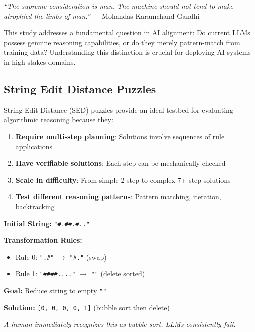 \documentclass[11pt,a4paper]{article}
\begin{document}
\begin{tcolorbox}[colback=blue!5,colframe=blue!50!black,title=AI Alignment Context]
\textit{``The supreme consideration is man. The machine should not tend to make atrophied the limbs of man.''} --- Mohandas Karamchand Gandhi

This study addresses a fundamental question in AI alignment: Do current LLMs possess genuine reasoning capabilities, or do they merely pattern-match from training data? Understanding this distinction is crucial for deploying AI systems in high-stakes domains.
\end{tcolorbox}

\subsection{String Edit Distance Puzzles}

String Edit Distance (SED) puzzles provide an ideal testbed for evaluating algorithmic reasoning because they:

\begin{enumerate}[leftmargin=*]
    \item \textbf{Require multi-step planning}: Solutions involve sequences of rule applications
    \item \textbf{Have verifiable solutions}: Each step can be mechanically checked
    \item \textbf{Scale in difficulty}: From simple 2-step to complex 7+ step solutions
    \item \textbf{Test different reasoning patterns}: Pattern matching, iteration, backtracking
\end{enumerate}

\begin{tcolorbox}[colback=gray!5,colframe=gray!50!black,title=Example SED Puzzle]
\textbf{Initial String:} \texttt{"\#.\#\#.\#.."}

\textbf{Transformation Rules:}
\begin{itemize}
    \item Rule 0: \texttt{".\#"} $\rightarrow$ \texttt{"\#."} (swap)
    \item Rule 1: \texttt{"\#\#\#\#...."} $\rightarrow$ \texttt{""} (delete sorted)
\end{itemize}

\textbf{Goal:} Reduce string to empty \texttt{""}

\textbf{Solution:} \texttt{[0, 0, 0, 0, 1]} (bubble sort then delete)

\textit{A human immediately recognizes this as bubble sort. LLMs consistently fail.}
\end{tcolorbox}
\end{document}
